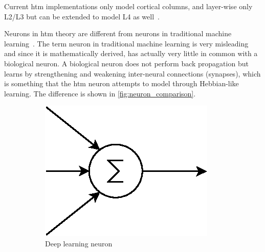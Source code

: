 Current \gls*{htm} implementations only model cortical columns, and layer-wise only L2/L3 but can be extended to model L4 as well~\cite{htm_l2_l3}.
\par
Neurons in \gls*{htm} theory are different from neurons in traditional machine learning~\cite{htm_neurons}. The term neuron in traditional machine learning is very misleading and since it is mathematically derived, has actually very little in common with a biological neuron. A biological neuron does not perform back propagation but learns by strengthening and weakening inter-neural connections (synapses), which is something that the \gls*{htm} neuron attempts to model through Hebbian-like learning. The difference is shown in \autoref{fig:neuron_comparison}.
\begin{figure}[H]
    \centering
    \begin{subfigure}[b]{0.35\linewidth}
        \includegraphics[width=\linewidth]{resources/related_works/neuron_ml}
        \caption{Deep learning neuron}
    \end{subfigure}\\
    \begin{subfigure}[b]{0.35\linewidth}
        \centering
        \hspace*{1cm}

\end{subfigure}
\end{figure}
